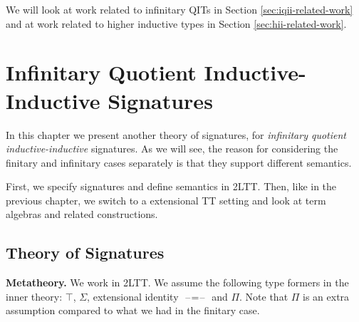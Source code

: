 \documentclass[12pt,a4paper,twoside,openany]{book}
\theoremstyle{remark}
\theoremstyle{definition}
\theoremstyle{theorem}
\newcommand{\blank}{\mathord{\hspace{1pt}\text{--}\hspace{1pt}}}
\begin{document}
We will look at work related to infinitary QITs in Section
\ref{sec:iqii-related-work} and at work related to higher inductive types in
Section \ref{sec:hii-related-work}.

\chapter[Infinitary QII Signatures]{Infinitary Quotient Inductive-Inductive Signatures}
\label{chap:iqiit}

In this chapter we present another theory of signatures, for \emph{infinitary
quotient inductive-inductive} signatures. As we will see, the reason for
considering the finitary and infinitary cases separately is that they support
different semantics.

First, we specify signatures and define semantics in 2LTT. Then, like in the
previous chapter, we switch to a extensional TT setting and look at term
algebras and related constructions.

\section{Theory of Signatures}

\textbf{Metatheory.} We work in 2LTT. We assume the following type formers in
the inner theory: $\top$, $\Sigma$, extensional identity $\blank\!=\!\blank$ and
$\Pi$. Note that $\Pi$ is an extra assumption compared to what we had in the
finitary case.
\end{document}
